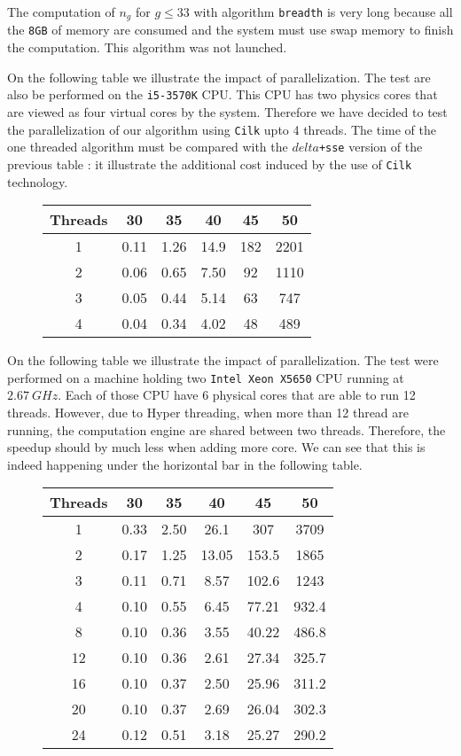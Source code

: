 \documentclass[reqno,11pt]{amsart}
\theoremstyle{plain}
\theoremstyle{definition}
\newcommand{\Cilk}{\texttt{Cilk}\xspace}
\renewcommand{\leq}{\leqslant}
\renewcommand{\tt}[1]{\texttt{#1}}
\newcommand{\Jean}[1]{{\color{blue}#1}}
\begin{document}
The computation of $n_g$ for $g\leq 33$ with algorithm \texttt{breadth} is very long because all the \texttt{8GB} of memory are consumed and the system must use swap memory to finish the computation. This algorithm was not launched.

\Jean{
On the following table we illustrate the impact of parallelization. The test are also be performed on the \tt{i5-3570K} CPU. This CPU has two physics cores that are viewed as four virtual cores by the system. Therefore we have decided to test the parallelization of our algorithm using \Cilk upto 4 threads. 
The time of the one threaded algorithm  must be compared with the \texttt{$delta$+sse} version of the previous table : it illustrate the additional cost induced by the use of \Cilk technology. 
  
  \begin{figure}[h!]
\begin{tabular}{|c|c|c|c|c|c|}
\hline
Threads & 30 & 35 & 40 & 45 & 50 \\
\hline
1 &  0.11 & 1.26 & 14.9 & 182 & 2201 \\ 
2 &  0.06 & 0.65 & 7.50 &  92 & 1110\\
3 &  0.05 & 0.44 & 5.14 &  63 & 747 \\
4 &  0.04 & 0.34 & 4.02 &  48 & 489 \\
\hline
\end{tabular}
\end{figure}
}

On the following table we illustrate the impact of parallelization. The test
were performed on a machine holding two \tt{Intel\texttrademark{}
  Xeon\texttrademark{} X5650} CPU running at $2.67~GHz$. Each of those CPU
have 6 physical cores that are able to run 12 threads. However, due to Hyper
threading, when more than 12 thread are running, the computation engine are
shared between two threads. Therefore, the speedup should by much less when
adding more core. We can see that this is indeed happening under the
horizontal bar in the following table.
  \begin{figure}[h!]
\begin{tabular}{|c|c|c|c|c|c|}
\hline
Threads & 30 & 35 & 40 & 45 & 50 \\
\hline
1 &  0.33 & 2.50 & 26.1 & 307 & 3709 \\
2 &  0.17 & 1.25 & 13.05 & 153.5 & 1865\\
3 &  0.11 & 0.71 & 8.57 & 102.6 & 1243 \\
4 &  0.10 & 0.55 & 6.45 &  77.21 & 932.4 \\
8 &  0.10 & 0.36 & 3.55 &  40.22 & 486.8 \\
12 &  0.10 & 0.36 & 2.61 & 27.34 & 325.7 \\\hline
16 &  0.10 & 0.37 & 2.50 & 25.96 & 311.2 \\
20 &  0.10 & 0.37 & 2.69 & 26.04 & 302.3 \\
24 &  0.12 & 0.51 & 3.18 & 25.27 & 290.2 \\
\hline
\end{tabular}
\end{figure}
\end{document}
